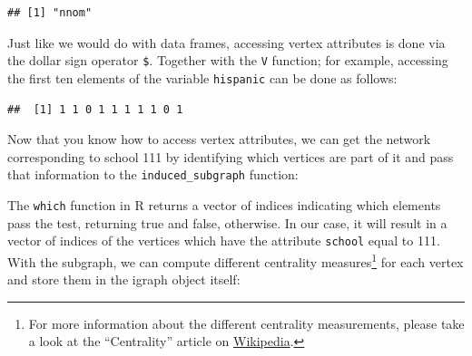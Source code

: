 \documentclass[]{book}
\newenvironment{Shaded}{\begin{snugshade}}{\end{snugshade}}
\newcommand{\CommentTok}[1]{\textcolor[rgb]{0.56,0.35,0.01}{\textit{#1}}}
\newcommand{\DataTypeTok}[1]{\textcolor[rgb]{0.13,0.29,0.53}{#1}}
\newcommand{\DecValTok}[1]{\textcolor[rgb]{0.00,0.00,0.81}{#1}}
\newcommand{\KeywordTok}[1]{\textcolor[rgb]{0.13,0.29,0.53}{\textbf{#1}}}
\newcommand{\NormalTok}[1]{#1}
\newcommand{\OperatorTok}[1]{\textcolor[rgb]{0.81,0.36,0.00}{\textbf{#1}}}
\newcommand{\StringTok}[1]{\textcolor[rgb]{0.31,0.60,0.02}{#1}}
\begin{document}
\begin{verbatim}
## [1] "nnom"
\end{verbatim}

Just like we would do with data frames, accessing vertex attributes is done via the dollar sign operator \texttt{\$}. Together with the \texttt{V} function; for example, accessing the first ten elements of the variable \texttt{hispanic} can be done as follows:

\begin{Shaded}
\end{Shaded}

\begin{verbatim}
##  [1] 1 1 0 1 1 1 1 1 0 1
\end{verbatim}

Now that you know how to access vertex attributes, we can get the network corresponding to school 111 by identifying which vertices are part of it and pass that information to the \texttt{induced\_subgraph} function:

\begin{Shaded}
\end{Shaded}

The \texttt{which} function in R returns a vector of indices indicating which elements pass the test, returning true and false, otherwise. In our case, it will result in a vector of indices of the vertices which have the attribute \texttt{school} equal to 111. With the subgraph, we can compute different centrality measures\footnote{For more information about the different centrality measurements, please take a look at the ``Centrality'' article on \href{https://en.wikipedia.org/wiki/Centrality}{Wikipedia}.} for each vertex and store them in the igraph object itself:
\end{document}
